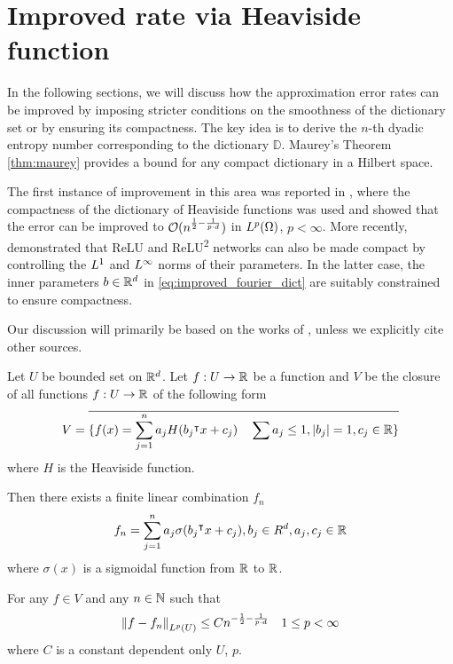\section{Improved rate via Heaviside function}
\label{sec:improved_heaviside}

In the following sections, we will discuss how the approximation error rates can
be improved by imposing stricter conditions on the smoothness of the dictionary
set or by ensuring its compactness. The key idea is to derive the $n$-th dyadic
entropy number corresponding to the dictionary $\mathbb{D}$. Maurey’s Theorem
\ref{thm:maurey} provides a bound for any compact dictionary in a Hilbert space.

The first instance of improvement in this area was reported in
\cite{makovozRandomApproximantsNeural1996}, where the compactness of the
dictionary of Heaviside functions was used and showed that the error can be
improved to $\mathcal{O}(n^{\frac{1}{2} - \frac{1}{p \cdot d}})$ in $L^{p}(\Omega)$,
$p < \infty$. More recently, \cite{klusowskiApproximationCombinationsReLU2018a}
demonstrated that ReLU and ReLU\textsuperscript{2} networks can also be made
compact by controlling the $L^{1}$ and $L^{\infty}$ norms of their parameters.
In the latter case, the inner parameters $b\in\mathbb{R}^d$ in
\eqref{eq:improved_fourier_dict} are suitably constrained to ensure compactness.

Our discussion will primarily be based on the works of
\cite{maUniformApproximationRates2022, siegelSharpBoundsApproximation2022,
klusowskiApproximationCombinationsReLU2018a}, unless we explicitly cite other
sources.

\begin{theorem}
    \label{thm:improve_barron}
    Let $U$ be bounded set on $\mathbb{R}^d$. Let $f: U \to \mathbb{R}$ be a function and $V$ be
    the closure of all functions $f: U \to \mathbb{R}$ of the following form
    \begin{equation}
        V = \overline{
            \{f(x) = \sum_{j=1}^n a_j H(b_j{}^{\intercal} x + c_j) \quad 
            \sum a_j \leq 1, \left| b_j \right| = 1, c_j \in \mathbb{R} \}
            }
    \end{equation}
    where $H$ is the Heaviside function.

    Then there exists a finite linear combination $f_n$ 
    \begin{equation}
        f_n = \sum_{j=1}^n a_j \sigma(b_j{}^{\intercal} x + c_j), b_j \in R^d, a_j, c_j \in \mathbb{R}
    \end{equation}
    where $\sigma(x)$ is a sigmoidal function from $\mathbb{R}$ to $\mathbb{R}$.

    For any $f \in V$ and any $n \in \mathbb{N}$ such that 
    \begin{equation}
        \left\| f- f_n \right\|_{L^{p}(U)} \leq C n^{-\frac{1}{2} - \frac{1}{p \cdot d}}
        \quad 1 \leq p < \infty
    \end{equation}
    where $C$ is a constant dependent only $U$, $p$.
\end{theorem}

